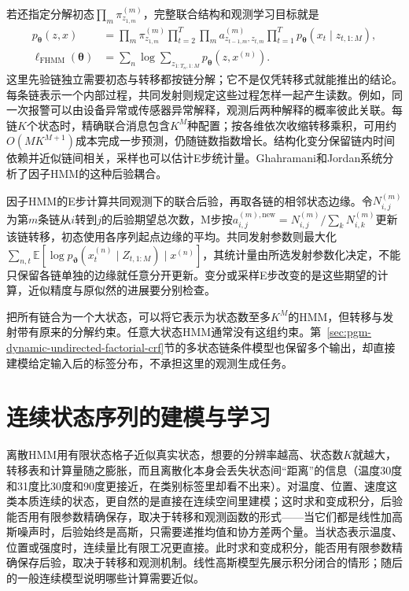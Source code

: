 若还指定分解初态$\prod_m\pi^{(m)}_{z_{1,m}}$，完整联合结构和观测学习目标就是
\begin{equation}
  \begin{aligned}
    p_{\bm\theta}(z,x)
      &=\prod_m\pi^{(m)}_{z_{1,m}}
        \prod_{t=2}^{T}\prod_m a^{(m)}_{z_{t-1,m},z_{t,m}}
        \prod_{t=1}^{T}p_{\bm\theta}(x_t\mid z_{t,1:M}),\\
    \ell_{\mathrm{FHMM}}(\bm\theta)
      &=\sum_n\log\sum_{z_{1:T_n,1:M}}
                            p_{\bm\theta}(z,x^{(n)}).
  \end{aligned}
  \label{eq:pgm-dynamic-factorial-objective}
\end{equation}
这里先验链独立需要初态与转移都按链分解；它不是仅凭转移式就能推出的结论。每条链表示一个内部过程，共同发射则规定这些过程怎样一起产生读数。例如，同一次报警可以由设备异常或传感器异常解释，观测后两种解释的概率彼此关联。每链$K$个状态时，精确联合消息包含$K^M$种配置；按各维依次收缩转移乘积，可用约$O(MK^{M+1})$成本完成一步预测，仍随链数指数增长。结构化变分保留链内时间依赖并近似链间相关，采样也可以估计E步统计量。Ghahramani和Jordan系统分析了因子HMM的这种后验耦合。

因子HMM的E步计算共同观测下的联合后验，再取各链的相邻状态边缘。令$N^{(m)}_{i,j}$为第$m$条链从$i$转到$j$的后验期望总次数，M步按$a^{(m),\mathrm{new}}_{i,j}=N^{(m)}_{i,j}/\sum_kN^{(m)}_{i,k}$更新该链转移，初态使用各序列起点边缘的平均。共同发射参数则最大化$\sum_{n,t}\mathbb E[\log p_{\bm\vartheta}(x_t^{(n)}\mid Z_{t,1:M})\mid x^{(n)}]$，其统计量由所选发射参数化决定，不能只保留各链单独的边缘就任意分开更新。变分或采样E步改变的是这些期望的计算，近似精度与原似然的进展要分别检查。

把所有链合为一个大状态，可以将它表示为状态数至多$K^M$的HMM，但转移与发射带有原来的分解约束。任意大状态HMM通常没有这组约束。第~\ref{sec:pgm-dynamic-undirected-factorial-crf}节的多状态链条件模型也保留多个输出，却直接建模给定输入后的标签分布，不承担这里的观测生成任务。

\section{连续状态序列的建模与学习}
\label{sec:pgm-dynamic-continuous}

离散HMM用有限状态格子近似真实状态，想要的分辨率越高、状态数$K$就越大，转移表和计算量随之膨胀，而且离散化本身会丢失状态间“距离”的信息（温度30度和31度比30度和90度更接近，在类别标签里却看不出来）。对温度、位置、速度这类本质连续的状态，更自然的是直接在连续空间里建模；这时求和变成积分，后验能否用有限参数精确保存，取决于转移和观测函数的形式——当它们都是线性加高斯噪声时，后验始终是高斯，只需要递推均值和协方差两个量。当状态表示温度、位置或强度时，连续量比有限工况更直接。此时求和变成积分，能否用有限参数精确保存后验，取决于转移和观测机制。线性高斯模型先展示积分闭合的情形；随后的一般连续模型说明哪些计算需要近似。

